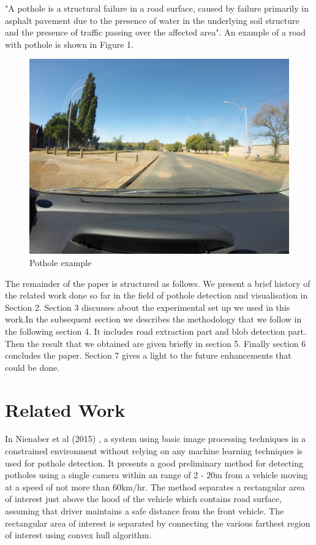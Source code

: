 \documentclass[journal]{IEEEtran}
\begin{document}
"A pothole \cite{pothole} is a structural failure in a road surface, caused by failure primarily in asphalt pavement due to the presence of water in the underlying soil structure and the presence of traffic passing over the affected area". An example of a road with pothole is shown in Figure 1.

\begin{figure}[!h]
\begin{center}
\includegraphics[scale=0.065]{Images/pothole_example.JPG}
\end{center}
\caption{Pothole example}
\end{figure}

The remainder of the paper is structured as follows. We present a brief history of the related work done so far in the field of pothole detection and visualisation in Section 2. Section 3 discusses about the experimental set up we used in this work.In the subsequent section we describes the methodology that we follow in the following section 4. It includes road extraction part and blob detection part. Then the result that we obtained are given briefly in section 5. Finally section 6 concludes the paper. Section 7 gives a light to the future enhancements that could be done.

\section{Related Work}
In Nienaber et al (2015) \cite{paperone}, a system using basic image processing techniques in a constrained environment without relying on any machine learning techniques is used for pothole detection. It presents a good preliminary method for detecting potholes using a single camera within an range of 2 - 20m from a vehicle moving at a speed of not more than 60km/hr. The method separates a rectangular area of interest just above the hood of the vehicle which contains road surface, assuming that driver maintains a safe distance from the front vehicle. The rectangular area of interest is separated by connecting the various farthest region of interest using convex hull algorithm.
\end{document}
